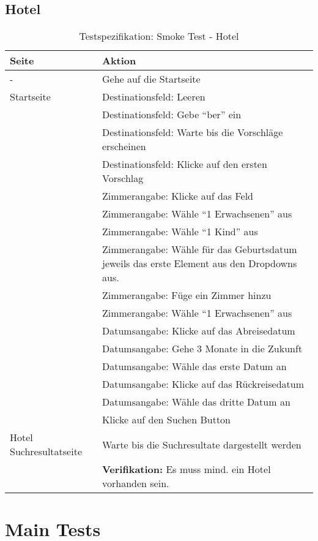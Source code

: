\subsection{Hotel}
\begin{table}[H] 
	\caption{Testspezifikation: Smoke Test - Hotel}
	\centering
		
	\begin{tabularx}{0.9\textwidth}{ | l | X | } 
			\hline 
			\textbf{Seite} & \textbf{Aktion} \\ \hline 
			\multirow{1}{*}{-} & Gehe auf die Startseite \\ \hline
			\multirow{1}{*}{Startseite} & Destinationsfeld: Leeren \\ \cline{2-2}
			& Destinationsfeld: Gebe "`ber"' ein \\ \cline{2-2}
			& Destinationsfeld: Warte bis die Vorschläge erscheinen \\ \cline{2-2}
			& Destinationsfeld: Klicke auf den ersten Vorschlag \\ \cline{2-2}
			& Zimmerangabe: Klicke auf das Feld \\ \cline{2-2}
			& Zimmerangabe: Wähle "`1 Erwachsenen"' aus \\ \cline{2-2}
			& Zimmerangabe: Wähle "`1 Kind"' aus \\ \cline{2-2}
			& Zimmerangabe: Wähle für das Geburtsdatum jeweils das erste Element aus den Dropdowns aus.  \\ \cline{2-2}
			& Zimmerangabe: Füge ein Zimmer hinzu \\ \cline{2-2}
			& Zimmerangabe: Wähle "`1 Erwachsenen"' aus \\ \cline{2-2}
			& Datumsangabe: Klicke auf das Abreisedatum \\ \cline{2-2}
			& Datumsangabe: Gehe 3 Monate in die Zukunft \\ \cline{2-2}
			& Datumsangabe: Wähle das erste Datum an \\ \cline{2-2}
			& Datumsangabe: Klicke auf das Rückreisedatum \\ \cline{2-2}
			& Datumsangabe: Wähle das dritte Datum an \\ \cline{2-2}
			& Klicke auf den Suchen Button \\ \hline
					
			\multirow{1}{*}{Hotel Suchresultatseite} & Warte bis die Suchresultate dargestellt werden \\ \cline{2-2}
			& \textbf{Verifikation:} Es muss mind. ein Hotel vorhanden sein. \\ \hline
	\end{tabularx} 
\end{table}

\section{Main Tests}